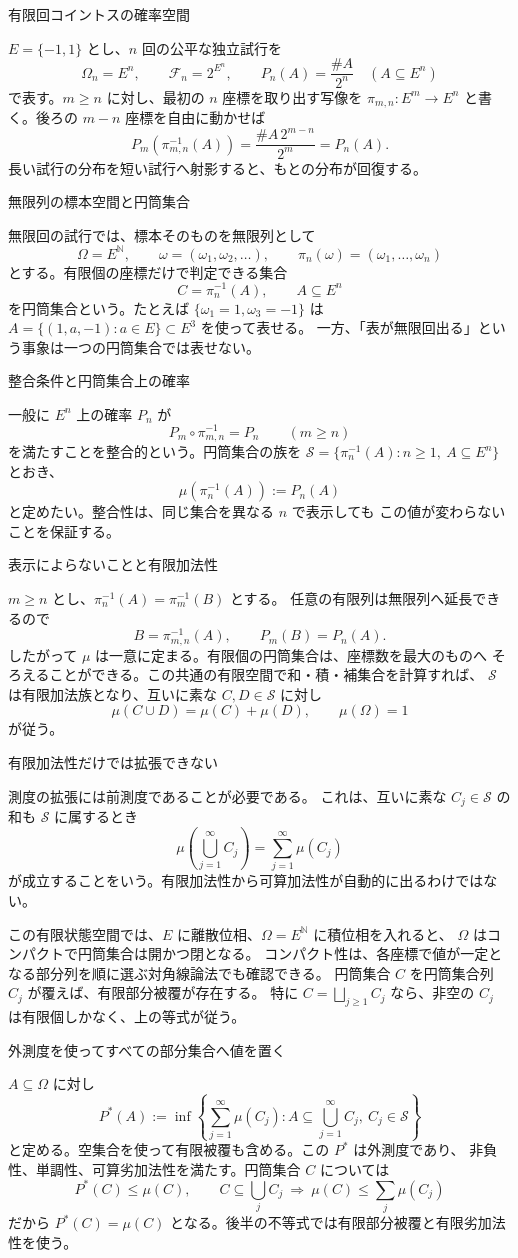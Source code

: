 \documentclass[a4paper,10pt,pdflatex,ja=standard,jafont=ipaex-type1,
  magstyle=real,scale=1]{bxjsarticle}
\newcommand{\topic}[1]{\par\vspace{5pt}
  {\large\sffamily\mdseries\color{accent}#1}\par\vspace{2pt}}
\newcommand{\F}{\mathcal F}
\newcommand{\N}{\mathbb N}
\begin{document}
\topic{有限回コイントスの確率空間}
$E=\{-1,1\}$ とし、$n$ 回の公平な独立試行を
$$
  \Omega_n=E^n,\qquad \F_n=2^{E^n},\qquad
  P_n(A)=\frac{\#A}{2^n}\quad(A\subseteq E^n)
$$
で表す。$m\ge n$ に対し、最初の $n$ 座標を取り出す写像を
$\pi_{m,n}:E^m\to E^n$ と書く。後ろの $m-n$ 座標を自由に動かせば
$$
  P_m(\pi_{m,n}^{-1}(A))
  =\frac{\#A\,2^{m-n}}{2^m}=P_n(A).
$$
長い試行の分布を短い試行へ射影すると、もとの分布が回復する。

\topic{無限列の標本空間と円筒集合}
無限回の試行では、標本そのものを無限列として
$$
  \Omega=E^\N,\qquad \omega=(\omega_1,\omega_2,\ldots),\qquad
  \pi_n(\omega)=(\omega_1,\ldots,\omega_n)
$$
とする。有限個の座標だけで判定できる集合
$$
  C=\pi_n^{-1}(A),\qquad A\subseteq E^n
$$
を円筒集合という。たとえば $\{\omega_1=1,\omega_3=-1\}$ は
$A=\{(1,a,-1):a\in E\}\subset E^3$ を使って表せる。
一方、「表が無限回出る」という事象は一つの円筒集合では表せない。

\topic{整合条件と円筒集合上の確率}
一般に $E^n$ 上の確率 $P_n$ が
$$P_m\circ\pi_{m,n}^{-1}=P_n\qquad(m\ge n)$$
を満たすことを整合的という。円筒集合の族を
$\mathcal S=\{\pi_n^{-1}(A):n\ge1,\ A\subseteq E^n\}$ とおき、
$$\mu(\pi_n^{-1}(A)):=P_n(A)$$
と定めたい。整合性は、同じ集合を異なる $n$ で表示しても
この値が変わらないことを保証する。

\newpage
\topic{表示によらないことと有限加法性}
$m\ge n$ とし、$\pi_n^{-1}(A)=\pi_m^{-1}(B)$ とする。
任意の有限列は無限列へ延長できるので
$$
  B=\pi_{m,n}^{-1}(A),\qquad P_m(B)=P_n(A).
$$
したがって $\mu$ は一意に定まる。有限個の円筒集合は、座標数を最大のものへ
そろえることができる。この共通の有限空間で和・積・補集合を計算すれば、
$\mathcal S$ は有限加法族となり、互いに素な $C,D\in\mathcal S$ に対し
$$\mu(C\cup D)=\mu(C)+\mu(D),\qquad \mu(\Omega)=1$$
が従う。

\topic{有限加法性だけでは拡張できない}
測度の拡張には前測度であることが必要である。
これは、互いに素な $C_j\in\mathcal S$ の和も $\mathcal S$ に属するとき
$$\mu\left(\bigcup_{j=1}^\infty C_j\right)=\sum_{j=1}^\infty\mu(C_j)$$
が成立することをいう。有限加法性から可算加法性が自動的に出るわけではない。

この有限状態空間では、$E$ に離散位相、$\Omega=E^\N$ に積位相を入れると、
$\Omega$ はコンパクトで円筒集合は開かつ閉となる。
コンパクト性は、各座標で値が一定となる部分列を順に選ぶ対角線論法でも確認できる。
円筒集合 $C$ を円筒集合列 $C_j$ が覆えば、有限部分被覆が存在する。
特に $C=\bigsqcup_{j\ge1}C_j$ なら、非空の $C_j$ は有限個しかなく、上の等式が従う。

\topic{外測度を使ってすべての部分集合へ値を置く}
$A\subseteq\Omega$ に対し
$$
 P^*(A):=\inf\left\{\sum_{j=1}^\infty\mu(C_j):
 A\subseteq\bigcup_{j=1}^\infty C_j,\ C_j\in\mathcal S\right\}
$$
と定める。空集合を使って有限被覆も含める。この $P^*$ は外測度であり、
非負性、単調性、可算劣加法性を満たす。円筒集合 $C$ については
$$
  P^*(C)\le\mu(C),\qquad
  C\subseteq\bigcup_j C_j\ \Longrightarrow\ \mu(C)\le\sum_j\mu(C_j)
$$
だから $P^*(C)=\mu(C)$ となる。後半の不等式では有限部分被覆と有限劣加法性を使う。
\end{document}
